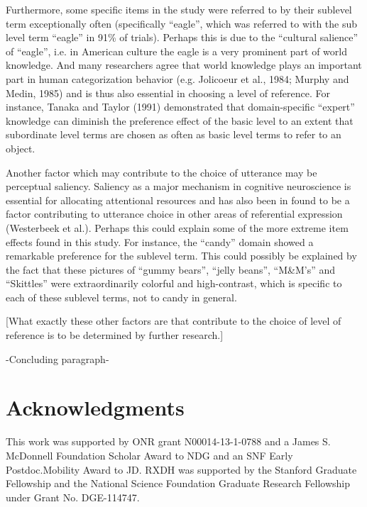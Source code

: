 \documentclass[10pt,letterpaper]{article}
\begin{document}
Furthermore, some specific items in the study were referred to by their sublevel term exceptionally often (specifically ``eagle'', which was referred to with the sub level term ``eagle'' in 91\% of trials). Perhaps this is due to the ``cultural salience'' of ``eagle'', i.e. in American culture the eagle is a very prominent part of world knowledge. And many researchers agree that world knowledge plays an important part in human categorization behavior (e.g. Jolicoeur et al., 1984; Murphy and Medin, 1985) and is thus also essential in choosing a level of reference. For instance, Tanaka and Taylor (1991) demonstrated that domain-specific ``expert'' knowledge can diminish the preference effect of the basic level to an extent that subordinate level terms are chosen as often as basic level terms to refer to an object.

Another factor which may contribute to the choice of utterance may be perceptual saliency. Saliency as a major mechanism in cognitive neuroscience is essential for allocating attentional resources and has also been in found to be a factor contributing to utterance choice in other areas of referential expression (Westerbeek et al.). Perhaps this could explain some of the more extreme item effects found in this study. For instance, the ``candy'' domain showed a remarkable preference for the sublevel term. This could possibly be explained by the fact that these pictures of ``gummy bears'', ``jelly beans'', ``M\&M’s'' and ``Skittles'' were extraordinarily colorful and high-contrast, which is specific to each of these sublevel terms, not to candy in general.

[What exactly these other factors are that contribute to the choice of level of reference is to be determined by further research.]

-Concluding paragraph-






\section{\bf Acknowledgments}

This work was supported by ONR grant N00014-13-1-0788 and a James S. McDonnell Foundation Scholar Award to NDG and an SNF Early Postdoc.Mobility Award to JD. RXDH was supported by the Stanford Graduate Fellowship and the National Science Foundation Graduate Research Fellowship under Grant No. DGE-114747.

\small




\setlength{\bibleftmargin}{.125in}
\setlength{\bibindent}{-\bibleftmargin}


\end{document}
